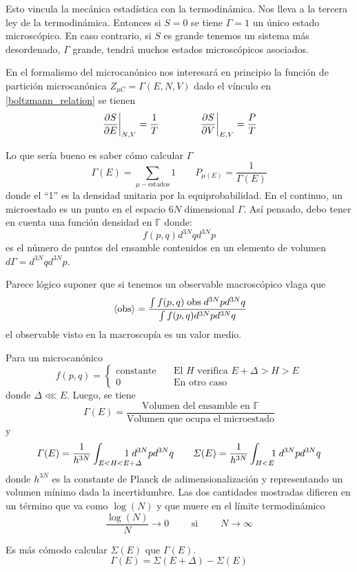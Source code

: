 \documentclass[10pt,oneside]{CBFT_book}
\begin{document}
Esto vincula la mecánica estadística con la termodinámica. Nos lleva a la tercera ley de la termodinámica.
Entonces si $S = 0$ se tiene $\Gamma=1$ un único estado microscópico. En caso contrario, si $S$ es
grande tenemos un sistema más desordenado, $\Gamma$ grande, tendrá muchos estados microscópicos
asociados.

En el formalismo del microcanónico nos interesará en principio la función de partición microcanónica
$Z_{\mu C} = \Gamma (E,N,V)$ dado el vínculo en \eqref{boltzmann_relation} se tienen
\[
	\left.\frac{\partial^{\hspace{-0.05em}} {S}}{\partial {E}^{\hspace{-0.05em}}}\right|_{N,V} = \frac{1}{T} \qquad \qquad \left.\frac{\partial^{\hspace{-0.05em}} {S}}{\partial {V}^{\hspace{-0.05em}}}\right|_{E,V} = \frac{P}{T}
\]

Lo que sería bueno es saber cómo calcular $\Gamma$
\[
	\Gamma(E) = \sum_{\mu-\text{estados}} 1 \qquad P_{\mu(E)} = \frac{1}{\Gamma(E)}
\]
donde el ``1'' es la densidad unitaria por la equiprobabilidad.
En el continuo, un microestado es un punto en el espacio $6N$ dimensional $\Gamma$.
Así pensado, debo tener en cuenta una función densidad en $\mathbb{\Gamma}$ donde:
\[
	f(p,q) d^{3N}q d^{3N}p
\]
es el número de puntos del ensamble contenidos en un elemento de volumen $d\Gamma = d^{3N}q d^{3N}p $.

Parece lógico suponer que si tenemos un observable macroscópico vlaga que 
\[
	\:\left\langle \text{obs} \right\rangle =
	\frac{\int f( p, q) \; \text{obs} \; d^{3N}p d^{3N}q}{\int f(p,q) d^{3N}p d^{3N}q } 
\]
el observable visto en la macroscopía es un valor medio.

Para un microcanónico
\[
	f(p,q) = \begin{cases}
			\text{constante} \quad &\text{El } H \text{ verifica }   E+\Delta > H > E \\
			0                \quad &\text{En otro caso}
	         \end{cases}
\]
donde $\Delta \lll E$. Luego, se tiene
\[
	\Gamma(E) = \frac{\text{Volumen del ensamble en $\mathbb{ \Gamma}$}}{\text{Volumen que ocupa el microestado}}
\]
y
\[
	\Gamma(E) = \frac{1}{h^{3N}} \int_{E < H < E+\Delta} \kern-2em 1 \; d^{3N}p d^{3N}q \qquad 
	\Sigma(E) = \frac{1}{h^{3N}} \int_{H < E } \kern-0.5em 1 \; d^{3N}p d^{3N}q
\]
donde $h^{3N}$ es la constante de Planck de adimensionalización y representando un volumen mínimo
dada la incertidumbre. Las dos cantidades mostradas difieren en un término que va como $\log(N)$ y
que muere en el límite termodinámico
\[
	\frac{\log(N)}{N} \to 0 \qquad \text{ si } \qquad  N \to \infty
\]

Es más cómodo calcular $\Sigma(E)$ que $\Gamma(E)$.
\[
	\Gamma(E) = \Sigma(E+\Delta) - \Sigma(E)
\]
\end{document}
